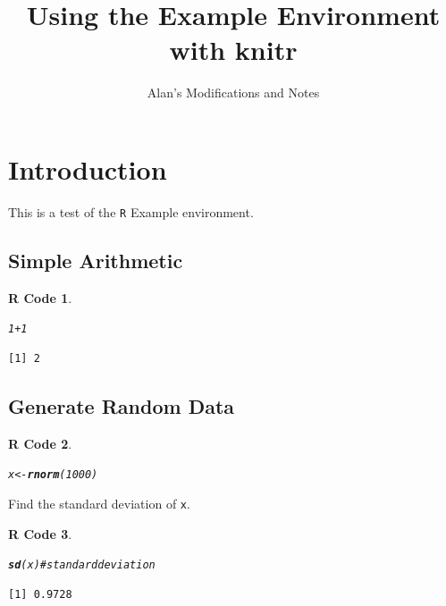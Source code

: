 \documentclass{article}\usepackage[]{graphicx}\usepackage[]{color}
\title{Using the Example Environment with \textbf{knitr}}
\author{Alan's Modifications and Notes}
\makeatletter
\newcommand{\hlnum}[1]{\textcolor[rgb]{0.686,0.059,0.569}{#1}}%
\newcommand{\hlcom}[1]{\textcolor[rgb]{0.678,0.584,0.686}{\textit{#1}}}%
\newcommand{\hlopt}[1]{\textcolor[rgb]{0,0,0}{#1}}%
\newcommand{\hlstd}[1]{\textcolor[rgb]{0.345,0.345,0.345}{#1}}%
\newcommand{\hlkwb}[1]{\textcolor[rgb]{0.69,0.353,0.396}{#1}}%
\newcommand{\hlkwd}[1]{\textcolor[rgb]{0.737,0.353,0.396}{\textbf{#1}}}%
\newenvironment{kframe}{%
 \def\at@end@of@kframe{}%
 \ifinner\ifhmode%
  \def\at@end@of@kframe{\end{minipage}}%
  \begin{minipage}{\columnwidth}%
 \fi\fi%
 \def\FrameCommand##1{\hskip\@totalleftmargin \hskip-\fboxsep
 \colorbox{shadecolor}{##1}\hskip-\fboxsep
     \hskip-\linewidth \hskip-\@totalleftmargin \hskip\columnwidth}%
 \MakeFramed {\advance\hsize-\width
   \@totalleftmargin\z@ \linewidth\hsize
   \@setminipage}}%
 {\par\unskip\endMakeFramed%
 \at@end@of@kframe}
\newenvironment{knitrout}{}{} %
\newtheorem{rcode}{R Code}[section]
\makeatother
\begin{document}
\maketitle




\section{Introduction}

This is a test of the \texttt{R} Example environment.

\subsection{Simple Arithmetic}

\begin{knitrout}
\color{fgcolor}\begin{kframe}
\begin{rcode}\label{test-a}\hfill{}\begin{alltt}
\hlnum{1} \hlopt{+} \hlnum{1}
\end{alltt}
\begin{verbatim}
[1] 2
\end{verbatim}
\end{rcode}\end{kframe}
\end{knitrout}



\subsection{Generate Random Data}

\begin{knitrout}
\color{fgcolor}\begin{kframe}
\begin{rcode}\label{test-b}\hfill{}\begin{alltt}
\hlstd{x} \hlkwb{<-} \hlkwd{rnorm}\hlstd{(}\hlnum{1000}\hlstd{)}
\end{alltt}
\end{rcode}\end{kframe}
\end{knitrout}

\noindent
Find the standard deviation of \texttt{x}.

\begin{knitrout}
\color{fgcolor}\begin{kframe}
\begin{rcode}\label{test-c}\hfill{}\begin{alltt}
\hlkwd{sd}\hlstd{(x)} \hlcom{# standard deviation}
\end{alltt}
\begin{verbatim}
[1] 0.9728
\end{verbatim}
\end{rcode}\end{kframe}
\end{knitrout}
\end{document}
